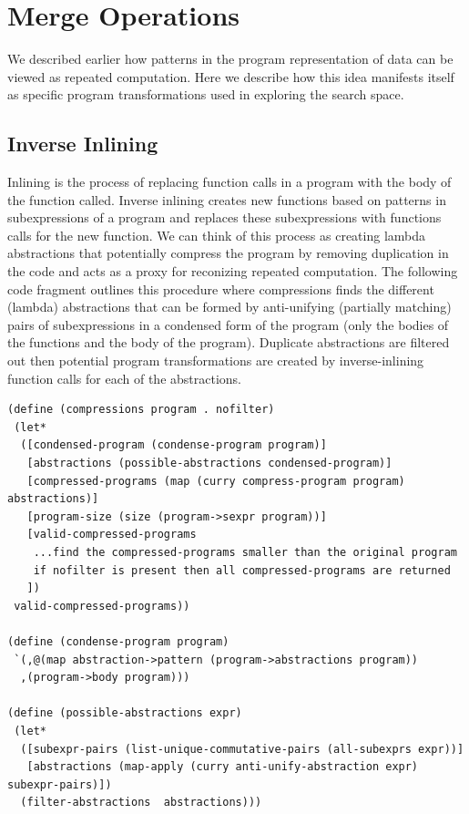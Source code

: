 \documentclass[a4paper,10pt]{article}
\begin{document}
\section{Merge Operations}
We described earlier how patterns in the program representation of data can be viewed as repeated computation.  Here we describe how this idea manifests itself as specific program transformations used in exploring the search space.

\subsection{Inverse Inlining}
Inlining is the process of replacing function calls in a program with the body of the function called.  Inverse inlining creates new functions based on patterns in subexpressions of a program and replaces these subexpressions with functions calls for the new function.  We can think of this process as creating lambda abstractions that potentially compress the program by removing duplication in the code and acts as a proxy for reconizing repeated computation.  The following code fragment outlines this procedure where compressions finds the different (lambda) abstractions that can be formed by anti-unifying (partially matching) pairs of subexpressions in a condensed form of the program (only the bodies of the functions and the body of the program).  Duplicate abstractions are filtered out then potential program transformations are created by inverse-inlining function calls for each of the abstractions.  

\begin{verbatim}
(define (compressions program . nofilter)
 (let* 
  ([condensed-program (condense-program program)]
   [abstractions (possible-abstractions condensed-program)]
   [compressed-programs (map (curry compress-program program) abstractions)]
   [program-size (size (program->sexpr program))]
   [valid-compressed-programs
    ...find the compressed-programs smaller than the original program
    if nofilter is present then all compressed-programs are returned
   ])
 valid-compressed-programs))

(define (condense-program program)
 `(,@(map abstraction->pattern (program->abstractions program))
  ,(program->body program)))

(define (possible-abstractions expr)
 (let* 
  ([subexpr-pairs (list-unique-commutative-pairs (all-subexprs expr))]
   [abstractions (map-apply (curry anti-unify-abstraction expr) subexpr-pairs)])
  (filter-abstractions  abstractions)))
\end{verbatim}
\end{document}
